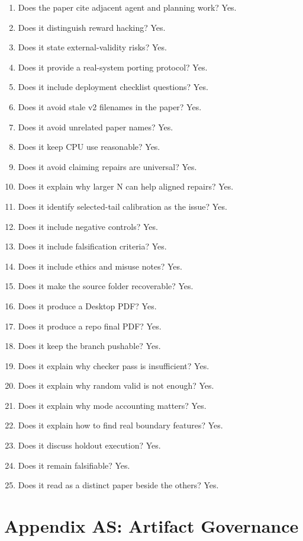 \documentclass{article}
\begin{document}
\begin{enumerate}
  \item Does the paper cite adjacent agent and planning work? Yes.
  \item Does it distinguish reward hacking? Yes.
  \item Does it state external-validity risks? Yes.
  \item Does it provide a real-system porting protocol? Yes.
  \item Does it include deployment checklist questions? Yes.
  \item Does it avoid stale v2 filenames in the paper? Yes.
  \item Does it avoid unrelated paper names? Yes.
  \item Does it keep CPU use reasonable? Yes.
  \item Does it avoid claiming repairs are universal? Yes.
  \item Does it explain why larger N can help aligned repairs? Yes.
  \item Does it identify selected-tail calibration as the issue? Yes.
  \item Does it include negative controls? Yes.
  \item Does it include falsification criteria? Yes.
  \item Does it include ethics and misuse notes? Yes.
  \item Does it make the source folder recoverable? Yes.
  \item Does it produce a Desktop PDF? Yes.
  \item Does it produce a repo final PDF? Yes.
  \item Does it keep the branch pushable? Yes.
  \item Does it explain why checker pass is insufficient? Yes.
  \item Does it explain why random valid is not enough? Yes.
  \item Does it explain why mode accounting matters? Yes.
  \item Does it explain how to find real boundary features? Yes.
  \item Does it discuss holdout execution? Yes.
  \item Does it remain falsifiable? Yes.
  \item Does it read as a distinct paper beside the others? Yes.
\end{enumerate}

\section*{Appendix AS: Artifact Governance}
\end{document}
